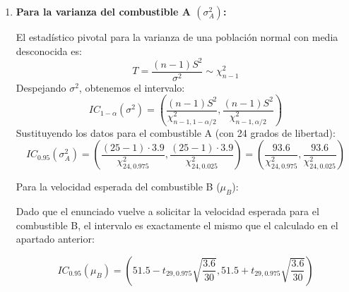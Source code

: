 \begin{enumerate}[label=\color{red}\textbf{\arabic*)}]
\begin{enumerate}[label=\color{red}\textbf{\alph*)}]
		            Sustituimos los datos y el cuantil de la distribución t de Student con $n_A-1=24$ grados de libertad: \[
			            IC_{0.95}(\mu_A)=\left( 51.3-t_{24,0.975}\sqrt{\dfrac{3.9}{25} },51.3+t_{24,0.975}\sqrt{\dfrac{3.9}{25} } \right)
		            \]
		            \textbf{Para el combustible B:}

		            Sustituimos los datos y el cuantil de la distribución t de Student con $n_B-1=29$ grados de libertad: \[
			            IC_{0.95}(\mu_B)=\left( 51.5-t_{29,0.975}\sqrt{\dfrac{3.6}{30} },51.5+t_{29,0.975}\sqrt{\dfrac{3.6}{30} } \right)
		            \]
		      \item {}

		            \textbf{Para la varianza del combustible A $(\sigma_A^2)$:}

		            El estadístico pivotal para la varianza de una población normal con media desconocida es: \[
			            T=\dfrac{(n-1)S^2}{\sigma^2}\sim \chi_{n-1}^2
		            \]
		            Despejando $\sigma^2$, obtenemos el intervalo: \[
			            IC_{1-\alpha}(\sigma^2)=\left( \dfrac{(n-1)S^2}{\chi_{n-1,1-\alpha / 2}^2}, \dfrac{(n-1)S^2}{\chi_{n-1,\alpha / 2}^2} \right)
		            \]
		            Sustituyendo los datos para el combustible A (con 24 grados de libertad):
		            $$IC_{0.95}(\sigma_A^2) = \left( \frac{(25-1) \cdot 3.9}{\chi_{24, 0.975}^2} , \frac{(25-1) \cdot 3.9}{\chi_{24, 0.025}^2} \right) = \left( \frac{93.6}{\chi_{24, 0.975}^2} , \frac{93.6}{\chi_{24, 0.025}^2} \right)$$

		            Para la velocidad esperada del combustible B ($\mu_B$):

		            Dado que el enunciado vuelve a solicitar la velocidad esperada para el combustible B, el intervalo es exactamente el mismo que el calculado en el apartado anterior:

		            $$IC_{0.95}(\mu_B) = \left( 51.5 - t_{29, 0.975}\sqrt{\frac{3.6}{30}} , 51.5 + t_{29, 0.975}\sqrt{\frac{3.6}{30}} \right)$$
	      \end{enumerate}
\end{enumerate}

